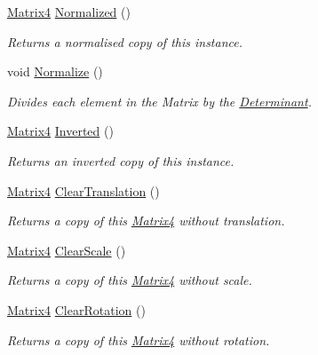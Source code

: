 \begin{DoxyCompactItemize}
\hyperlink{struct_open_t_k_1_1_matrix4}{Matrix4} \hyperlink{struct_open_t_k_1_1_matrix4_a6b52de6274d0c869fb409085fa44ab55}{Normalized} ()
\begin{DoxyCompactList}\small\item\em Returns a normalised copy of this instance. \end{DoxyCompactList}\item 
void \hyperlink{struct_open_t_k_1_1_matrix4_ada3becff78e8e572d2b07016d9f9c5a6}{Normalize} ()
\begin{DoxyCompactList}\small\item\em Divides each element in the Matrix by the \hyperlink{struct_open_t_k_1_1_matrix4_a2763231a75e342ff722346ac609ac5f7}{Determinant}. \end{DoxyCompactList}\item 
\hyperlink{struct_open_t_k_1_1_matrix4}{Matrix4} \hyperlink{struct_open_t_k_1_1_matrix4_a74360f6f2c126528a283c3fb3e1dd6e0}{Inverted} ()
\begin{DoxyCompactList}\small\item\em Returns an inverted copy of this instance. \end{DoxyCompactList}\item 
\hyperlink{struct_open_t_k_1_1_matrix4}{Matrix4} \hyperlink{struct_open_t_k_1_1_matrix4_adc888f16267650085ee63bf48a764af1}{Clear\-Translation} ()
\begin{DoxyCompactList}\small\item\em Returns a copy of this \hyperlink{struct_open_t_k_1_1_matrix4}{Matrix4} without translation. \end{DoxyCompactList}\item 
\hyperlink{struct_open_t_k_1_1_matrix4}{Matrix4} \hyperlink{struct_open_t_k_1_1_matrix4_a51c911305cbc74593c8fd6607e617f63}{Clear\-Scale} ()
\begin{DoxyCompactList}\small\item\em Returns a copy of this \hyperlink{struct_open_t_k_1_1_matrix4}{Matrix4} without scale. \end{DoxyCompactList}\item 
\hyperlink{struct_open_t_k_1_1_matrix4}{Matrix4} \hyperlink{struct_open_t_k_1_1_matrix4_a5d3ff58473d6728771572e4a883c0c55}{Clear\-Rotation} ()
\begin{DoxyCompactList}\small\item\em Returns a copy of this \hyperlink{struct_open_t_k_1_1_matrix4}{Matrix4} without rotation. \end{DoxyCompactList}\item 

\end{DoxyCompactItemize}

